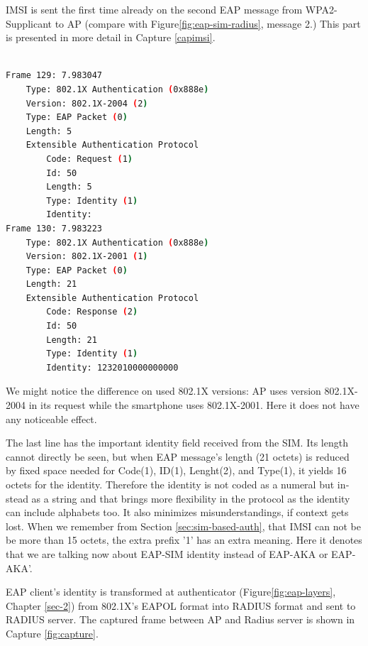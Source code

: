 \documentclass[12pt,a4paper,english]{tutthesis}
\begin{document}
\begin{otherlanguage}{english}
IMSI is sent the first time already on the second EAP message from 
WPA2-Supplicant to AP (compare with Figure\ref{fig:eap-sim-radius}, message 2.)
This part is presented in more detail in Capture \ref{capimsi}.

\renewcommand{\lstlistingname}{Capture}

\begin{lstlisting}[language=bash,
  label=capimsi,
  caption={First detailed indication of IMSI, captured from WPA2-supplicant}
]

Frame 129: 7.983047
    Type: 802.1X Authentication (0x888e)
    Version: 802.1X-2004 (2)
    Type: EAP Packet (0)
    Length: 5
    Extensible Authentication Protocol
        Code: Request (1)
        Id: 50
        Length: 5
        Type: Identity (1)
        Identity: 
Frame 130: 7.983223
    Type: 802.1X Authentication (0x888e)
    Version: 802.1X-2001 (1)
    Type: EAP Packet (0)
    Length: 21
    Extensible Authentication Protocol
        Code: Response (2)
        Id: 50
        Length: 21
        Type: Identity (1)
        Identity: 1232010000000000
\end{lstlisting}
\normalsize

We might notice the difference on used 802.1X versions: AP uses version
802.1X-2004 in its request while the smartphone uses 802.1X-2001. Here
it does not have any  noticeable effect.

The last line has the important identity field received from the SIM.
Its length cannot directly be seen, but when EAP message's length (21
octets) is reduced by fixed space needed for Code(1), ID(1),
Lenght(2), and Type(1), it yields 16 octets for the
identity. Therefore the identity is not coded as a 
numeral but instead as a string and that brings more flexibility in
the protocol as the identity can include alphabets too. It also
minimizes misunderstandings, if context gets lost. 
When we remember from Section \ref{sec:sim-based-auth}, that IMSI can not be
be more than 15 octets, the extra prefix '1' has an extra meaning.
Here it denotes that we are talking  now about EAP-SIM identity instead of
EAP-AKA or EAP-AKA'.





EAP client's identity is transformed at authenticator
(Figure\ref{fig:eap-layers}, Chapter \ref{sec-2}) from 802.1X's 
EAPOL format  into RADIUS format and
sent to RADIUS server. The captured frame between AP and Radius server is
shown
in Capture \ref{fig:capture}.



\end{otherlanguage}
\end{document}

